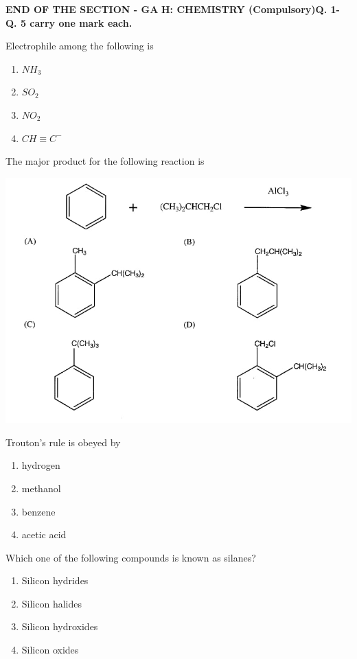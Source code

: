 \documentclass[journal]{IEEEtran}
\begin{document}
	\textbf{END OF THE SECTION - GA}
\newpage
	\textbf{H: CHEMISTRY (Compulsory)\newline Q. 1- Q. 5 carry one mark each.}
\begin{enumerate}
	\item{ Electrophile among the following is
		\begin{enumerate}
			\item{ $NH_3$}
			\item{ $SO_2$}
			\item{ $NO_2$}
			\item{$CH \equiv C^-$}

		\end{enumerate}
	\item{ The major product for the following reaction is}
	
	\includegraphics[width=\textwidth]{3}
	\item{ Trouton's rule is obeyed by}
		\begin{enumerate}
			\item{ hydrogen}
			\item{methanol}
			\item{benzene}
			\item{ acetic acid}

		\end{enumerate}
	\item{ Which one of the following compounds is known as silanes?}
		\begin{enumerate}
			\item{ Silicon hydrides}
			\item{ Silicon halides}
			\item{ Silicon hydroxides}
			\item{ Silicon oxides}


\end{enumerate}}
\end{enumerate}
\end{document}
